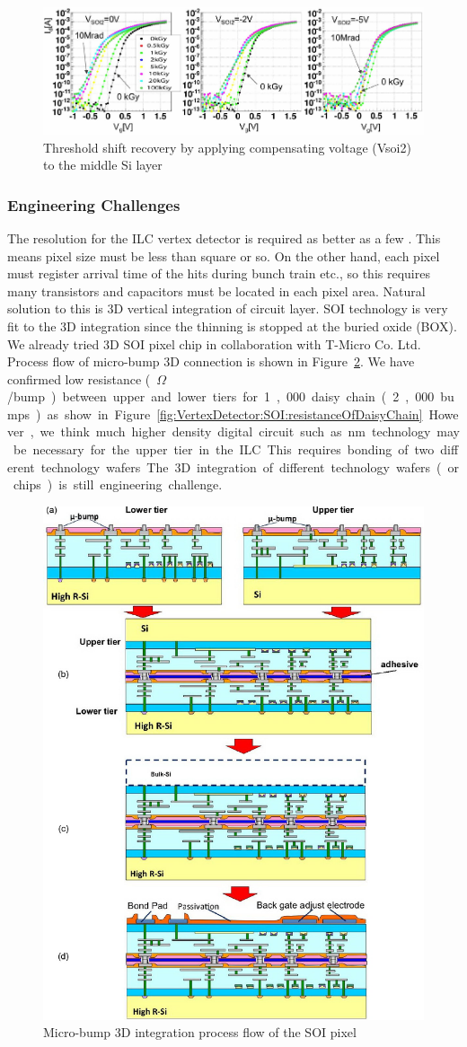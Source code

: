 \begin{figure}
\centering
\includegraphics[width=.5\textwidth]{VertexDetector/SOI/thresholdShift}
\caption{Threshold shift recovery by applying compensating voltage (Vsoi2) to the middle Si layer}
\label{fig:VertexDetector:SOI:thresholdShift}
\end{figure}

\subsubsection{Engineering Challenges}
The resolution for the ILC vertex detector is required as better as a few \micron. This means pixel size must be less than \unit[20]{\micron} square or so. On the other hand, each pixel must register arrival time of the hits during bunch train etc., so this requires many transistors and capacitors must be located in each pixel area.
Natural solution to this is 3D vertical integration of circuit layer. SOI technology is very fit to the 3D integration since the thinning is stopped at the buried oxide (BOX). We already tried 3D SOI pixel chip in collaboration with T-Micro Co. Ltd. Process flow of micro-bump 3D connection is shown in Figure~\ref{fig:VertexDetector:SOI:microbump3D}. We have confirmed low resistance (~\unit[6]{$\Omega$}/bump) between upper and lower tiers for 1,000 daisy chain (2,000 bumps) as show in Figure~\ref{fig:VertexDetector:SOI:resistanceOfDaisyChain}.
However, we think much higher density digital circuit such as \unit[32]{nm} technology may be necessary for the upper tier in the ILC. This requires bonding of two different technology wafers. The 3D integration of different technology wafers (or chips) is still engineering challenge.

\begin{figure}
\centering
\includegraphics[width=.5\textwidth]{VertexDetector/SOI/microBump3DIntegration}
\caption{Micro-bump 3D integration process flow of the SOI pixel}
\label{fig:VertexDetector:SOI:microbump3D}
\end{figure}

